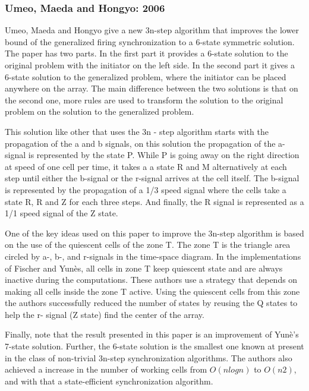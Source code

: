 \documentclass{article}
\begin{document}
\subsubsection{Umeo, Maeda and Hongyo: 2006} 
Umeo, Maeda and Hongyo \cite{umeo2006design} give a new 3n-step algorithm that improves the lower bound of the generalized firing synchronization to a 6-state symmetric solution. The paper has two parts. In the first part it provides a 6-state solution to the original problem with the initiator on the left side. In the second part it gives a 6-state solution to the generalized problem, where the initiator can be placed anywhere on the array. The main difference between the two solutions is that on the second one, more rules are used to transform the solution to the original problem on the solution to the generalized problem.

This solution like other that uses the 3n - step algorithm starts with the propagation of the a and b signals, on this solution the propagation of the a- signal is represented by the state P. While P is going away on the right direction at speed of one cell per time, it takes a a state R and M alternatively at each step until either the b-signal or the r-signal arrives at the cell itself. The b-signal is represented by the propagation of a 1/3 speed signal where the cells take a state R, R and Z for each three steps. And finally, the R signal is represented as a 1/1 speed signal of the Z state.   

One of the key ideas used on this paper to improve the 3n-step algorithm is based on the use of the quiescent cells of the zone T. The zone T is the triangle area circled by a-, b-, and r-signals in the time-space diagram. In the implementations of Fischer and Yun\`{e}s, all cells in zone T keep quiescent state and are always inactive during the computations. These authors use a strategy that depends on making all cells inside the zone T active. Using the quiescent cells from this zone the authors successfully reduced the number of states by reusing the Q states to help the r- signal (Z state) find the center of the array.

Finally, note that the result presented in this paper is an improvement of Yun\`{e}'s 7-state solution. Further, the 6-state solution is the smallest one known at present in the class of non-trivial 3n-step synchronization algorithms. The authors also achieved a increase in the number of working cells from $O(n log n)$ to $O(n2)$, and with that a state-efficient synchronization algorithm.
\end{document}
